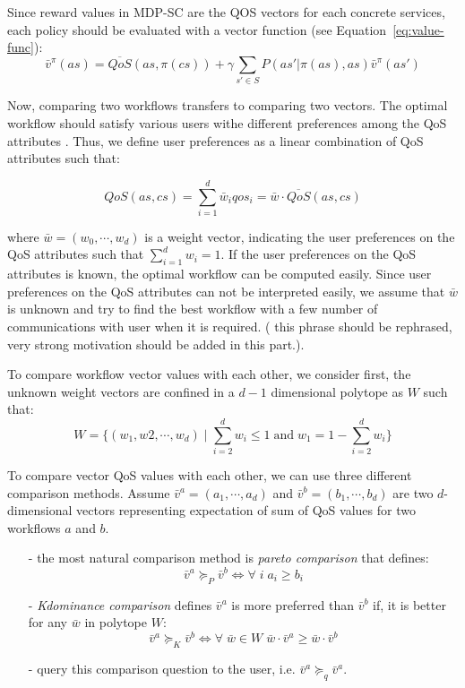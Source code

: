 \documentclass{sigchi}
\begin{document}
Since reward values in MDP-SC are the QOS vectors for each concrete services, each policy should be evaluated with a vector function (see Equation~\ref{eq:value-func}):
\begin{equation}
\bar{v}^{\pi}(as) = \overline{QoS}(as, \pi(cs)) + \gamma \sum_{s' \in S} P(as' | \pi(as), as) \bar{v}^{\pi}(as')
\end{equation}

Now, comparing two workflows transfers to comparing two vectors. The optimal workflow should satisfy various users withe different preferences among the QoS attributes \cite{DBLP:journals/tase/KhanoucheACKY16}. Thus, we define user preferences as a linear combination of QoS attributes such that:

\begin{equation}
QoS(as, cs) = \sum_{i=1}^d \bar{w}_i qos_i = \bar{w} \cdot \overline{QoS}(as, cs) 
\end{equation} 

where $\bar{w} = (w_0, \cdots, w_d) $ is a weight vector, indicating the user preferences on the QoS attributes such that $\sum_{i=1}^d w_i = 1$. If the user preferences on the QoS attributes is known, the optimal workflow can be computed easily. Since user preferences on the QoS attributes can not be interpreted easily, we assume that $\bar{w}$ is unknown and try to find the best workflow with a few number of communications with user when it is required. ({\color{red} this phrase should be rephrased, very strong motivation should be added in this part.}). 

To compare workflow vector values with each other, we consider first, the unknown weight vectors are confined in a $d-1$ dimensional polytope as $W$ such that:
\begin{equation}
W = \{ (w_1, w2, \cdots, w_d) \; | \; \sum_{i=2}^d w_i \leq 1 \; \text{and} \; w_1 = 1-\sum_{i=2}^d w_i \}
\end{equation}

To compare vector QoS values with each other, we can use three different comparison methods. Assume $\bar{v}^a = (a_1, \cdots, a_d)$  and $\bar{v}^b = (b_1, \cdots, b_d)$ are two $d$-dimensional vectors representing expectation of sum of QoS values for two workflows $a$ and $b$. 

\begin{itemize}
\item[-] the most natural comparison method is \emph{pareto comparison} that defines:
\begin{equation}
\bar{v}^a \succeq_P \bar{v}^b \Leftrightarrow \forall \; i \; a_i \geq b_i
\end{equation}
\item[-] \emph{Kdominance comparison} defines $\bar{v}^a$ is more preferred than $\bar{v}^b$ if, it is better for any $\bar{w}$ in polytope $W$:
\begin{equation}
\bar{v}^a \succeq_K \bar{v}^b \Leftrightarrow \forall \; \bar{w} \in W \; \bar{w} \cdot \bar{v}^a \geq \bar{w} \cdot \bar{v}^b
\end{equation}
\item[-] query this comparison question to the user, i.e. $\bar{v}^a  \succeq_q \bar{v}^a$. 
\end{itemize} 
\end{document}
